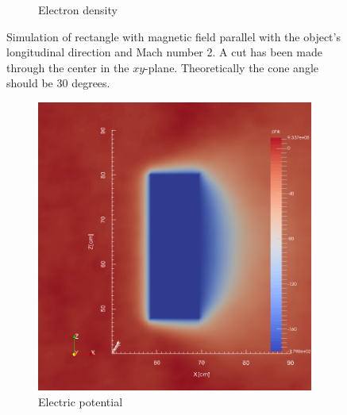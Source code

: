 \documentclass[twoside]{article}
\begin{document}
\begin{figure}[H]
\begin{subfigure}{.5\textwidth}
  \caption{Electron density}
  \label{fig:sub22}
\end{subfigure}
\caption{Simulation of rectangle with magnetic field parallel with the object's longitudinal direction and Mach number 2. A cut has been made through the center in the $xy$-plane. Theoretically the cone angle should be 30 degrees.}
\label{fig:2}
\end{figure}

\begin{figure}[H]
\centering
\begin{subfigure}{.5\textwidth}
  \centering
  \includegraphics[width=\linewidth]{phis_1sim_kobe_B50.png}
  \caption{Electric potential}
  \label{fig:sub31}
\end{subfigure}%
\begin{subfigure}{.5\textwidth}
  \centering

\end{subfigure}
\end{figure}
\end{document}
